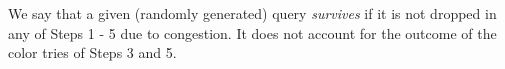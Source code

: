We say that a given (randomly generated) query \emph{survives} if it is not dropped in any of Steps 1 - 5 due to congestion. It does not account for the outcome of the color tries of Steps 3 and 5.

